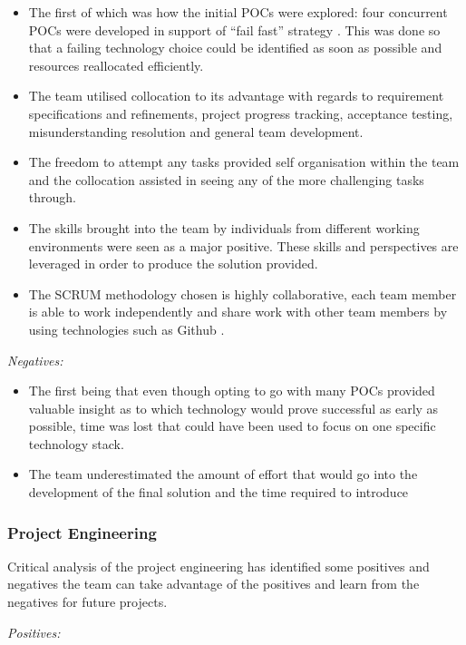\documentclass[12pt]{witseiepaper}
\begin{document}
\begin{itemize}
\item The first of which was how the initial POCs were explored: four concurrent POCs were developed in support of “fail fast” strategy \cite{Fail}. This was done so that a failing technology choice could be identified as soon as possible and resources reallocated efficiently.
\item The team utilised collocation to its advantage with regards to requirement specifications and refinements, project progress tracking, acceptance testing, misunderstanding resolution and general team development. 
\item The freedom to attempt any tasks provided self organisation within the team and the collocation assisted in seeing any of the more challenging tasks through.
\item The skills brought into the team by individuals from different working environments were seen as a major positive. These skills and perspectives are leveraged in order to produce the solution provided.
\item The SCRUM methodology chosen is highly collaborative, each team member is able to work independently and share work with other team members by using technologies such as Github \cite{GitHub}. 
\end{itemize}

\textit{Negatives:}

\begin{itemize}
\item The first being that even though opting to go with many POCs provided valuable insight as to which technology would prove successful as early as possible, time was lost that could have been used to focus on one specific technology stack.
\item The team underestimated the amount of effort that would go into the development of the final solution and the time required to introduce 
\end{itemize}

\subsubsection{Project Engineering}

Critical analysis of the project engineering has identified some positives and negatives the team can take advantage of the positives and learn from the negatives for future projects. 

\textit{Positives:}
\end{document}
